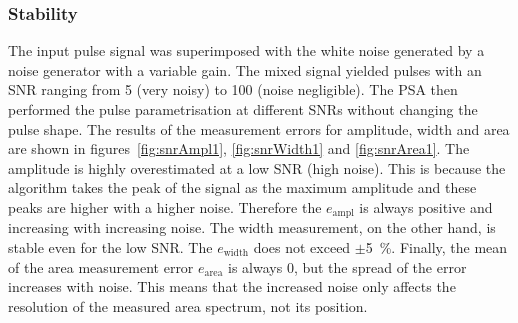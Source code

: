 \subsubsection{Stability}
The input pulse signal was superimposed with the white noise generated by a noise generator with a variable gain. The mixed signal yielded pulses with an SNR ranging from 5 (very noisy) to 100 (noise negligible). The PSA then performed the pulse parametrisation at different SNRs without changing the pulse shape. The results of the measurement errors for amplitude, width and area are shown in figures~\ref{fig:snrAmpl1}, \ref{fig:snrWidth1} and \ref{fig:snrArea1}. The amplitude is highly overestimated at a low SNR (high noise). This is because the algorithm takes the peak of the signal as the maximum amplitude and these peaks are higher with a higher noise. Therefore the $e_\mathrm{ampl}$ is always positive and increasing with increasing noise. The width measurement, on the other hand, is stable even for the low SNR. The $e_\mathrm{width}$ does not exceed $\pm$5~\%. Finally, the mean of the area measurement error $e_\mathrm{area}$ is always 0, but the spread of the error increases with noise. This means that the increased noise only affects the resolution of the measured area spectrum, not its position.

